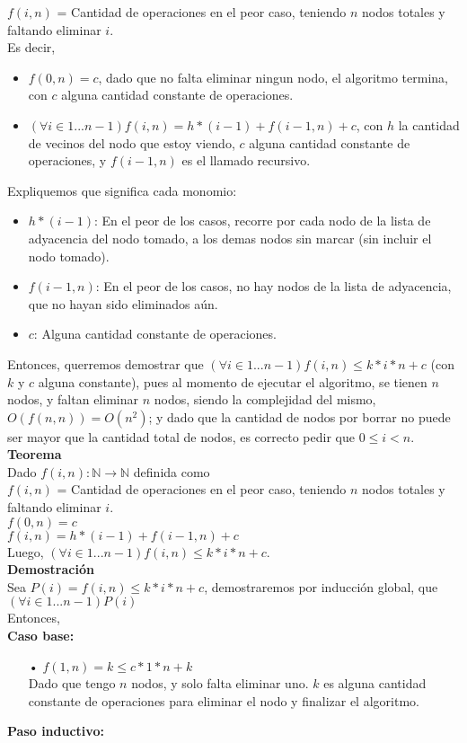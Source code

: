 $f(i,n)$ = Cantidad de operaciones en el peor caso, teniendo $n$ nodos totales y faltando eliminar $i$.\\
Es decir,\par
\begin{itemize}
	\item$f(0,n) = c$, dado que no falta eliminar ningun nodo, el algoritmo termina, con $c$ alguna cantidad constante de operaciones.\par
	\item $(\forall i \in {1...n-1}) f(i,n) = h*(i-1) + f(i-1,n) + c$, con $h$ la cantidad de vecinos del nodo que estoy viendo, $c$ alguna cantidad constante de operaciones, y $f(i-1,n)$ es el llamado recursivo.\\
\end{itemize}
Expliquemos que significa cada monomio:
\begin{itemize}
	\item $h*(i-1)$: En el peor de los casos, recorre por cada nodo de la lista de adyacencia del nodo tomado, a los demas nodos sin marcar (sin incluir el nodo tomado).
	\item $f(i-1,n)$: En el peor de los casos, no hay nodos de la lista de adyacencia, que no hayan sido eliminados aún.
	\item $c$: Alguna cantidad constante de operaciones.
\end{itemize}
Entonces, querremos demostrar que $(\forall i \in {1...n-1}) f(i,n) \leq k*i*n + c$ (con $k$ y $c$ alguna constante), pues al momento de ejecutar el algoritmo, se tienen $n$ nodos, y faltan eliminar $n$ nodos, siendo la complejidad del mismo, $O(f(n,n)) = O(n^{2})$; y dado que la cantidad de nodos por borrar no puede ser mayor que la cantidad total de nodos, es correcto pedir que $0 \leq i < n$.\\

\newpage
{\large\textbf{Teorema}}\\
Dado $f(i,n): \mathbb{N} \rightarrow \mathbb{N}$ definida como\\
$f(i,n)$ = Cantidad de operaciones  en el peor caso, teniendo $n$ nodos totales y faltando eliminar $i$.\\
$f(0,n) = c$\\
$f(i,n) = h*(i-1) + f(i-1,n) + c$\\
Luego, $(\forall i \in {1...n-1}) f(i,n) \leq k*i*n + c$.\\

{\large\textbf{Demostración}}\\
Sea $P(i) = f(i,n) \leq k*i*n + c$, demostraremos por inducción global, que $(\forall i \in {1...n-1}) P(i)$\\
Entonces,\\
\textbf{Caso base:}
\begin{itemize}
    \item[•] $f(1,n) = k \leq c*1*n + k$\\
    Dado que tengo $n$ nodos, y solo falta eliminar uno. $k$ es alguna cantidad constante de operaciones para eliminar el nodo y finalizar el algoritmo.
\end{itemize}
\textbf{Paso inductivo:}\\

